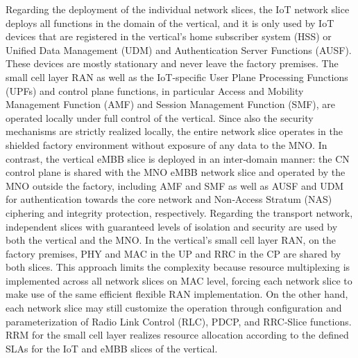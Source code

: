 \documentclass{report}
\begin{document}
Regarding the deployment of the individual network slices, the IoT network slice deploys all functions in the domain of the vertical, and it is only used by IoT
devices that are registered in the vertical’s home subscriber system (HSS) or Unified Data Management
(UDM) and Authentication Server Functions (AUSF). These devices are mostly stationary and never
leave the factory premises. The small cell layer RAN as well as the IoT‐specific User Plane Processing
Functions (UPFs) and control plane functions, in particular Access and Mobility Management
Function (AMF) and Session Management Function (SMF), are operated locally under full control of
the vertical. Since also the security mechanisms are strictly realized locally, the entire network slice operates in the shielded factory environment without exposure of any data to the MNO. In contrast, the vertical eMBB slice is deployed
in an inter‐domain manner: the CN control plane is shared with the MNO
eMBB network slice and operated by the MNO outside the factory, including AMF and SMF as well
as AUSF and UDM for authentication towards the core network and Non‐Access Stratum (NAS)
ciphering and integrity protection, respectively. Regarding the transport network, independent slices
with guaranteed levels of isolation and security are used by both the vertical and the MNO. In the vertical’s small cell layer RAN, on the factory premises, PHY and MAC in the UP
and RRC in the CP are shared by both slices. This approach limits the complexity because resource
multiplexing is implemented across all network slices on MAC level, forcing each network slice to
make use of the same efficient flexible RAN implementation. On the other hand, each network slice
may still customize the operation through configuration and parameterization of Radio Link Control
(RLC), PDCP, and RRC‐Slice functions. RRM for the small cell layer realizes resource allocation
according to the defined SLAs for the IoT and eMBB slices of the vertical.
\end{document}
